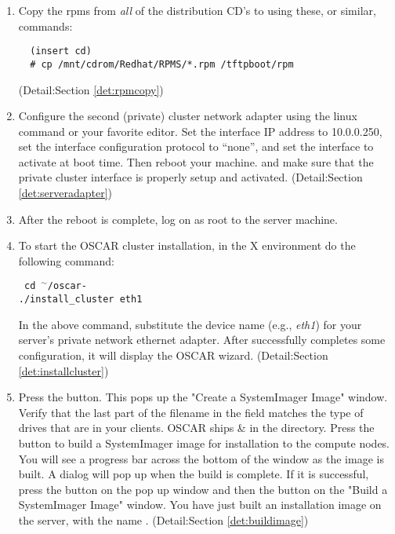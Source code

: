 \begin {enumerate}
Ignore the configure script, it is not used in the installation process
of OSCAR.

(Detail:Section \ref{det:unpack})

\item Copy the rpms from \emph{all} of the distribution CD's to 
using these, or similar, commands:

\begin{verbatim}
  (insert cd)
  # cp /mnt/cdrom/Redhat/RPMS/*.rpm /tftpboot/rpm
\end{verbatim}
(Detail:Section \ref{det:rpmcopy})

\item Configure the second (private) cluster network adapter using the linux
 command or your favorite editor. Set the interface 
IP address to 10.0.0.250, set the interface configuration protocol
to ``none'', and set the interface to activate at boot time.
Then reboot your machine. and make sure that the private cluster
interface is properly setup and activated. 
(Detail:Section \ref{det:serveradapter})

\item After the reboot is complete, log on as root to the server 
machine.

\item To start the OSCAR cluster installation,  in the X environment do
the following command:

\vspace{11pt}
{\tt
  cd $^\sim$/oscar-\oscarversion \\
  ./install\_cluster eth1
}
\vspace{11pt}
  
In the above command, substitute the device name 
(e.g., \emph{eth1})
for your server's private network ethernet adapter. After 
successfully completes some configuration, it will display 
the OSCAR wizard.
(Detail:Section \ref{det:installcluster})

\item Press the  button. 
This pops up the "Create a SystemImager Image" window. Verify that the last
part of the filename in the  field matches
the type of drives that are in your clients. OSCAR ships 
\&  in the  directory.
Press the  button to build a SystemImager image for installation to
the compute nodes.  You will see a progress bar across the bottom
of the window as the image is built.  A dialog will pop up when the build is complete. 
If it is successful, press the  button on the pop up window 
and then the  button on the "Build a SystemImager
Image" window. You have just built an installation image on the
server, with the name .
(Detail:Section \ref{det:buildimage})


\end{enumerate}
